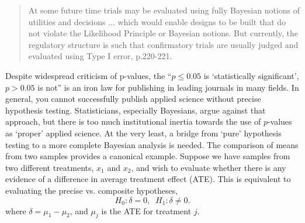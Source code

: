 \documentclass{juliacon}
\begin{document}
\begin{quote}
	At some future time trials may be evaluated using fully Bayesian notions of utilities and decisions ... which would enable designs to be built that do not violate the Likelihood Principle or Bayesian notions.  But currently, the regulatory structure is such that confirmatory trials are usually judged and evaluated using Type I error\cite{Berry20ll}, p.220-221.
\end{quote}
\vskip 6pt
Despite widespread criticism of p-values\cite{Berry2017}, the ``$p \le 0.05$ is ‘statistically significant’, $p > 0.05$ is not'' is an iron law for publishing in leading journals in many fields\cite{Wass2019}. In general, you cannot successfully publish applied science without precise hypothesis testing.  Statisticians, especially Bayesians, argue against that approach, but there is too much institutional inertia towards the use of $p$-values as `proper’ applied science\cite{Wass2019}.  At the very least, a bridge from `pure’ hypothesis testing to a more complete Bayesian analysis is needed.
\vskip 6pt
The comparison of means from two samples provides a canonical example. Suppose we have samples from two different treatments, $x_1$ and $x_2$, and wish to evaluate whether there is any evidence of a difference in average treatment effect (ATE).  This is equivalent to evaluating the precise vs. composite hypotheses,  
\begin{equation} 
H_0: \delta = 0, \; \; H_1: \delta \ne 0. 
\label{eq:hoh1}
\end{equation}
where $\delta = \mu_1 - \mu_2$, and $\mu_j$ is the ATE for treatment $j$.
\end{document}
